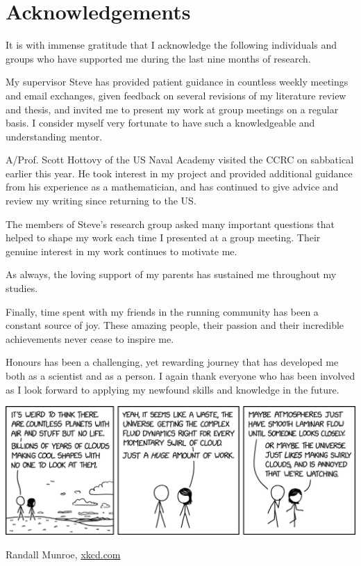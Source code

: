 \documentclass[../main.tex]{subfiles}
\begin{document}
\makeatletter\@openrightfalse\makeatother
\chapter*{Acknowledgements}
It is with immense gratitude that I acknowledge the following
individuals and groups who have supported me during the last nine months
of research.

My supervisor Steve has provided patient guidance in countless weekly
meetings and email exchanges, given feedback on several revisions of my
literature review and thesis, and invited me to present my work at group
meetings on a regular basis. I consider myself very fortunate to have such a
knowledgeable and understanding mentor.

A/Prof. Scott Hottovy of the US Naval Academy visited the CCRC on sabbatical
earlier this year. He took interest in my project and provided additional
guidance from his experience as a mathematician, and has continued to give
advice and review my writing since returning to the US.

The members of Steve's research group asked many important questions that
helped to shape my work each time I presented at a group meeting. Their genuine
interest in my work continues to motivate me.

As always, the loving support of my parents has sustained me throughout my
studies.

Finally, time spent with my friends in the running community has been a
constant source of joy. These amazing people, their passion and their
incredible achievements never cease to inspire me.

Honours has been a challenging, yet rewarding journey that has developed me
both as a scientist and as a person. I again thank everyone who has been
involved as I look forward to applying my newfound skills and knowledge in
the future.


\clearpage
\vspace*{\fill}
\begin{center}
    \includegraphics[width=\linewidth]{figures/cloud_swirls.png}

    {
        \footnotesize \color{gray}
        Randall Munroe, \href{https://xkcd.com/2664/}{xkcd.com}
    }
\end{center}
\vfill
\end{document}
